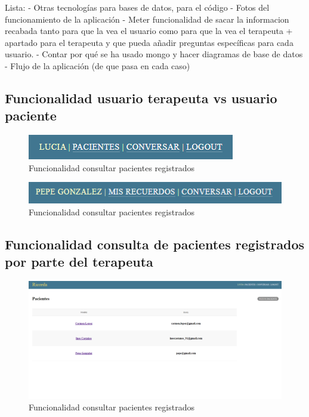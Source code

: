 Lista: 
- Otras tecnologías para bases de datos, para el código 
- Fotos del funcionamiento de la aplicación 
- Meter funcionalidad de sacar la informacion recabada tanto para que la vea el usuario como para que la vea el terapeuta + apartado para el terapeuta y que pueda añadir preguntas específicas para cada usuario. 
- Contar por qué se ha usado mongo y hacer diagramas de base de datos
- Flujo de la aplicación (de que pasa en cada caso)

\subsection{Funcionalidad usuario terapeuta vs usuario paciente}

\begin{figure}[h]
	\centering
	\includegraphics[scale=1.0]{Imagenes/Vectorial/funcionalidad_terapeutavspaciente}
	\caption{Funcionalidad consultar pacientes registrados}
	\label{fig:funcionalidadterapeutavspacientes}
\end{figure}

\begin{figure}[h]
	\centering
	\includegraphics[scale=1.0]{Imagenes/Vectorial/funcionalidad_terapeutavspaciente2}
	\caption{Funcionalidad consultar pacientes registrados}
	\label{fig:funcionalidad_terapeutavspaciente2}
\end{figure}

\subsection{Funcionalidad consulta de pacientes registrados por parte del terapeuta}

\begin{figure}[h]
	\centering
	\includegraphics[scale=0.3]{Imagenes/Vectorial/funcionalidad_consultar_pacientes}
	\caption{Funcionalidad consultar pacientes registrados}
	\label{fig:funcionalidadconsultadepacientes}
\end{figure}

